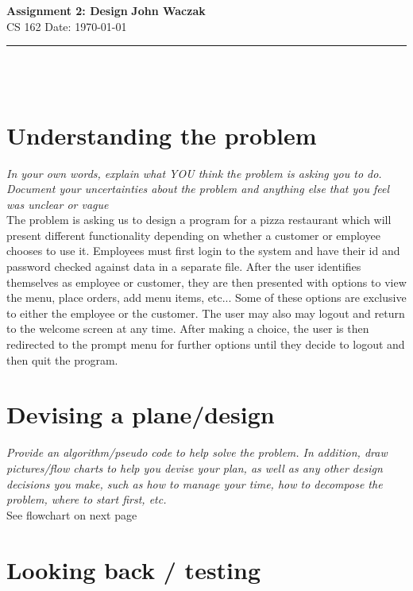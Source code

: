 \documentclass[a4paper, 11pt]{article}
\begin{document}
\noindent
\large\textbf{Assignment 2: Design} \hfill \textbf{John Waczak} \\
\normalsize CS 162 \hfill  Date: \today 
\par\noindent\rule{\textwidth}{0.4pt} \\\\



\section*{Understanding the problem}

\textit{In your own words, explain what YOU think the problem is asking you to
  do.  Document your uncertainties about the problem and anything else that you
  feel was unclear or vague}\\

The problem is asking us to design a program for a pizza restaurant which will
present different functionality depending on whether a customer or employee
chooses to use it. Employees must first login to the system and have their id
and password checked against data in a separate file. After the user identifies
themselves as employee or customer, they are then presented with options to view
the menu, place orders, add menu items, etc... Some of these options are
exclusive to either the employee or the customer. The user may also may logout
and return to the welcome screen at any time. After making a choice, the user is
then redirected to the prompt menu for further options until they decide to
logout and then quit the program. 
\section*{Devising a plane/design}

\textit{Provide an algorithm/pseudo code to help solve the problem. In addition,
  draw pictures/flow charts to help you devise your plan, as well as any other
  design decisions you make, such as how to manage your time, how to decompose
  the problem, where to start first, etc. }\\ 

See flowchart on next page




\section*{Looking back / testing}
\end{document}
